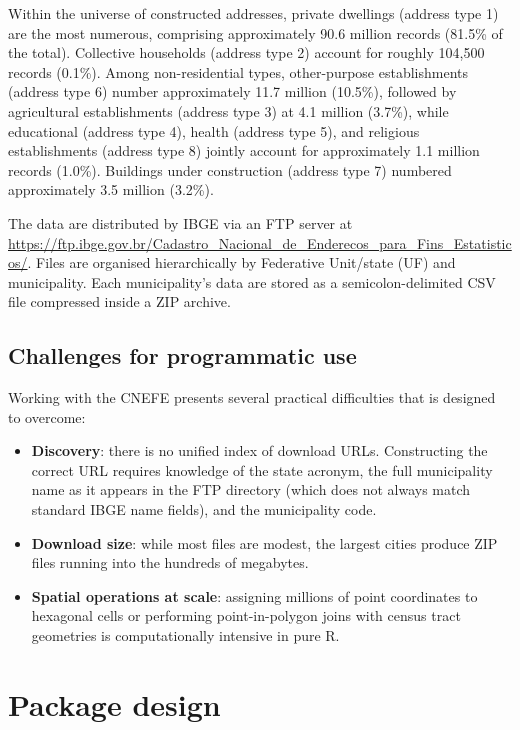 Within the universe of constructed addresses, private dwellings (address
type 1) are the most numerous, comprising approximately 90.6 million
records (81.5\% of the total). Collective households (address type 2)
account for roughly 104,500 records (0.1\%). Among non-residential types,
other-purpose establishments (address type 6) number approximately 11.7
million (10.5\%), followed by agricultural establishments (address type
3) at 4.1 million (3.7\%), while educational (address type 4), health
(address type 5), and religious establishments (address type 8) jointly
account for approximately 1.1 million records (1.0\%). Buildings under
construction (address type 7) numbered approximately 3.5 million (3.2\%).

The data are distributed by IBGE via an FTP server at
\url{https://ftp.ibge.gov.br/Cadastro_Nacional_de_Enderecos_para_Fins_Estatisticos/}.
Files are organised hierarchically by Federative Unit/state (UF) and
municipality. Each municipality's data are stored as a
semicolon-delimited CSV file compressed inside a ZIP archive.

\subsection{Challenges for programmatic use}\label{challenges-for-programmatic-use}

Working with the CNEFE presents several practical difficulties that
 is designed to overcome:

\begin{itemize}
\item
  \textbf{Discovery}: there is no unified index of download URLs.
  Constructing the correct URL requires knowledge of the state
  acronym, the full municipality name as it appears in the FTP
  directory (which does not always match standard IBGE name fields),
  and the municipality code.
\item
  \textbf{Download size}: while most files are modest, the largest cities
  produce ZIP files running into the hundreds of megabytes.
\item
  \textbf{Spatial operations at scale}: assigning millions of point
  coordinates to hexagonal cells or performing point-in-polygon joins
  with census tract geometries is computationally intensive in pure R.
\end{itemize}

\section{Package design}\label{package-design}

